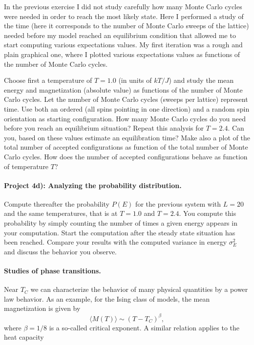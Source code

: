 \documentclass[10pt,showpacs,preprintnumbers,footinbib,amsmath,amssymb,aps,prl,twocolumn,groupedaddress,superscriptaddress,showkeys]{revtex4-1}
\begin{document}
In the previous exercise  I did not study carefully how many Monte Carlo cycles were needed in order to reach the most likely state. Here
I performed a study of the time (here it corresponds to the number 
of Monte Carlo sweeps of the lattice) needed before my model reached an equilibrium condition 
that allowed me to start computing various expectations values. My 
first iteration was a rough and plain graphical
one, where I plotted various expectations values as functions of the number of Monte Carlo cycles.

Choose first a temperature of $T=1.0$ (in units of $kT/J$) and study the 
mean energy and magnetization (absolute value) as functions of the number of Monte Carlo cycles. Let the number of Monte Carlo cycles (sweeps per lattice)
represent time.
Use both an ordered (all spins pointing in one direction) and a random
spin orientation as starting configuration. 
How many Monte Carlo cycles do you need before you reach an equilibrium situation?
Repeat this analysis for $T=2.4$. 
Can you, based on these values estimate an equilibration time?
Make also a plot of the total number of accepted configurations 
as function of the total number of Monte Carlo cycles. How does the number of
accepted configurations behave as function of temperature $T$?

\paragraph{Project 4d): Analyzing the probability distribution.}
Compute thereafter the probability
$P(E)$ for the previous system with $L=20$ and the same temperatures, that is at $T=1.0$ and $T=2.4$.
You compute this probability by simply counting the number of times a 
given energy appears in your computation. Start the computation after 
the steady state situation has been reached.
Compare your results with the computed variance in energy 
$\sigma^2_E$ and discuss the behavior you observe. 

\paragraph{Studies of phase transitions.}
Near $T_C$ we can characterize the behavior of many physical quantities
by a power law behavior.
As an example, for the Ising class of models, 
the mean magnetization is given by
\[
  \langle M(T) \rangle \sim \left(T-T_C\right)^{\beta},
\]
where $\beta=1/8$ is a so-called critical exponent. A similar relation
applies to the heat capacity
\end{document}
